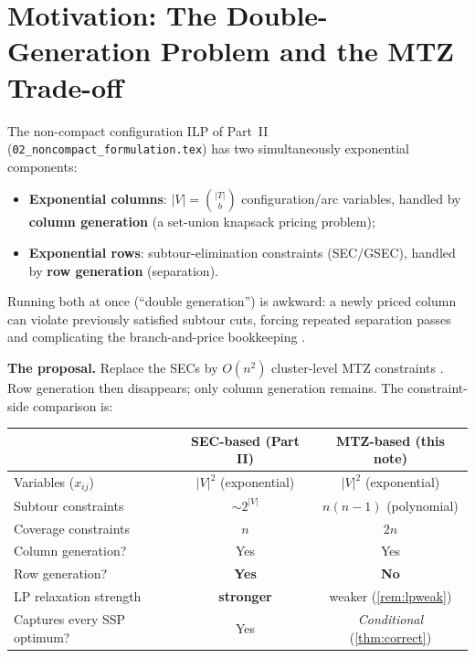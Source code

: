 \documentclass[11pt,a4paper]{article}
\theoremstyle{plain}
\theoremstyle{definition}
\begin{document}
\vspace{0.3cm}
\tableofcontents
\newpage

\section{Motivation: The Double-Generation Problem and the MTZ Trade-off}
\label{sec:motivation}

The non-compact configuration ILP of Part~II
(\texttt{02\_noncompact\_formulation.tex}) has two simultaneously exponential components:
\begin{itemize}
\item \textbf{Exponential columns}: $|V|=\binom{|T|}{b}$ configuration/arc variables,
      handled by \textbf{column generation} (a set-union knapsack pricing problem);
\item \textbf{Exponential rows}: subtour-elimination constraints (SEC/GSEC), handled by
      \textbf{row generation} (separation).
\end{itemize}
Running both at once (``double generation'') is awkward: a newly priced column can violate
previously satisfied subtour cuts, forcing repeated separation passes and complicating the
branch-and-price bookkeeping \cite{Barnhart1998,Lubbecke2005}.

\medskip\noindent\textbf{The proposal.} Replace the SECs by $O(n^2)$ cluster-level MTZ
constraints \cite{Miller1960}. Row generation then disappears; only column generation
remains. The constraint-side comparison is:
\begin{center}
	\renewcommand{\arraystretch}{1.3}
	\begin{tabular}{lcc}
		\toprule
		& \textbf{SEC-based (Part II)} & \textbf{MTZ-based (this note)} \\
		\midrule
		Variables ($x_{ij}$) & $|V|^2$ (exponential) & $|V|^2$ (exponential) \\
		Subtour constraints & $\sim 2^{|V|}$ & $n(n-1)$ (polynomial) \\
		Coverage constraints & $n$ & $2n$ \\
		Column generation? & Yes & Yes \\
		Row generation? & \textbf{Yes} & \textbf{No} \\
		LP relaxation strength & \textbf{stronger} & weaker (\cref{rem:lpweak}) \\
		Captures every SSP optimum? & Yes & \emph{Conditional} (\cref{thm:correct}) \\
		\bottomrule
	\end{tabular}
\end{center}
\end{document}
